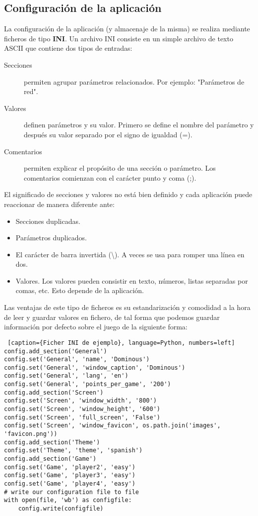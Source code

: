 \subsection{Configuración de la aplicación}

La configuración de la aplicación (y almacenaje de la misma) se realiza mediante ficheros de tipo \textbf{INI}. Un archivo
INI consiste en un simple archivo de texto ASCII que contiene dos tipos de entradas:

\begin{description}
    \item[Secciones] permiten agrupar parámetros relacionados. Por ejemplo: "Parámetros de red".
    \item[Valores] definen parámetros y su valor. Primero se define el nombre del parámetro y después su valor separado por
            el signo de igualdad (=).
    \item[Comentarios] permiten explicar el propósito de una sección o parámetro. Los comentarios comienzan con el carácter
            punto y coma (;).
\end{description}

El significado de secciones y valores no está bien definido y cada aplicación puede reaccionar de manera diferente ante:

\begin{itemize}
    \item Secciones duplicadas.
    \item Parámetros duplicados.
    \item El carácter de barra invertida (\textbackslash). A veces se usa para romper una línea en dos.
    \item Valores. Los valores pueden consistir en texto, números, listas separadas por comas, etc. Esto depende de la aplicación.
\end{itemize}

Las ventajas de este tipo de ficheros es su estandarización y comodidad a la hora de leer y guardar valores en fichero,
de tal forma que podemos guardar información por defecto sobre el juego de la siguiente forma:

\begin{lstlisting} [caption={Ficher INI de ejemplo}, language=Python, numbers=left]
config.add_section('General')
config.set('General', 'name', 'Dominous')
config.set('General', 'window_caption', 'Dominous')
config.set('General', 'lang', 'en')
config.set('General', 'points_per_game', '200')
config.add_section('Screen')
config.set('Screen', 'window_width', '800')
config.set('Screen', 'window_height', '600')
config.set('Screen', 'full_screen', 'False')
config.set('Screen', 'window_favicon', os.path.join('images', 'favicon.png'))
config.add_section('Theme')
config.set('Theme', 'theme', 'spanish')
config.add_section('Game')
config.set('Game', 'player2', 'easy')
config.set('Game', 'player3', 'easy')
config.set('Game', 'player4', 'easy')
# write our configuration file to file
with open(file, 'wb') as configfile:
    config.write(configfile)
\end{lstlisting}

